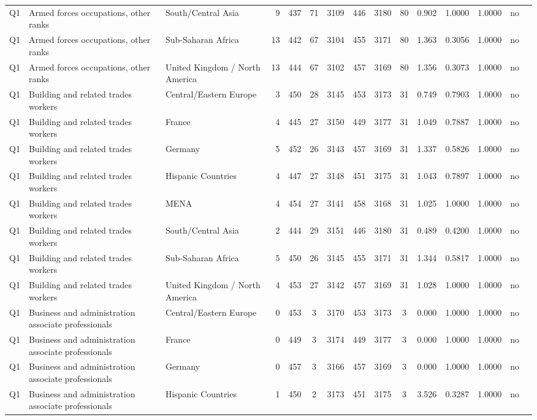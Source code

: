 \begin{longtable}{lllrcccccccccll}
Q1 & Armed forces occupations, other ranks & South/Central Asia & 9 & 437 & 71 & 3109 & 446 & 3180 & 80 & 0.902 & 1.0000 & 1.0000 & no \\
Q1 & Armed forces occupations, other ranks & Sub-Saharan Africa & 13 & 442 & 67 & 3104 & 455 & 3171 & 80 & 1.363 & 0.3056 & 1.0000 & no \\
Q1 & Armed forces occupations, other ranks & United Kingdom / North America & 13 & 444 & 67 & 3102 & 457 & 3169 & 80 & 1.356 & 0.3073 & 1.0000 & no \\
Q1 & Building and related trades workers & Central/Eastern Europe & 3 & 450 & 28 & 3145 & 453 & 3173 & 31 & 0.749 & 0.7903 & 1.0000 & no \\
Q1 & Building and related trades workers & France & 4 & 445 & 27 & 3150 & 449 & 3177 & 31 & 1.049 & 0.7887 & 1.0000 & no \\
Q1 & Building and related trades workers & Germany & 5 & 452 & 26 & 3143 & 457 & 3169 & 31 & 1.337 & 0.5826 & 1.0000 & no \\
Q1 & Building and related trades workers & Hispanic Countries & 4 & 447 & 27 & 3148 & 451 & 3175 & 31 & 1.043 & 0.7897 & 1.0000 & no \\
Q1 & Building and related trades workers & MENA & 4 & 454 & 27 & 3141 & 458 & 3168 & 31 & 1.025 & 1.0000 & 1.0000 & no \\
Q1 & Building and related trades workers & South/Central Asia & 2 & 444 & 29 & 3151 & 446 & 3180 & 31 & 0.489 & 0.4200 & 1.0000 & no \\
Q1 & Building and related trades workers & Sub-Saharan Africa & 5 & 450 & 26 & 3145 & 455 & 3171 & 31 & 1.344 & 0.5817 & 1.0000 & no \\
Q1 & Building and related trades workers & United Kingdom / North America & 4 & 453 & 27 & 3142 & 457 & 3169 & 31 & 1.028 & 1.0000 & 1.0000 & no \\
Q1 & Business and administration associate professionals & Central/Eastern Europe & 0 & 453 & 3 & 3170 & 453 & 3173 & 3 & 0.000 & 1.0000 & 1.0000 & no \\
Q1 & Business and administration associate professionals & France & 0 & 449 & 3 & 3174 & 449 & 3177 & 3 & 0.000 & 1.0000 & 1.0000 & no \\
Q1 & Business and administration associate professionals & Germany & 0 & 457 & 3 & 3166 & 457 & 3169 & 3 & 0.000 & 1.0000 & 1.0000 & no \\
Q1 & Business and administration associate professionals & Hispanic Countries & 1 & 450 & 2 & 3173 & 451 & 3175 & 3 & 3.526 & 0.3287 & 1.0000 & no \\

\end{longtable}
